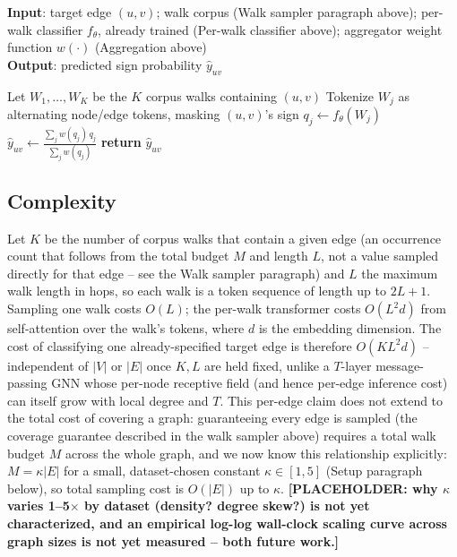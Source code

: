 \documentclass[letterpaper]{article} %
\newcommand{\method}{\textsc{Pewter}\xspace}
\newcommand{\ph}[1]{\textbf{[#1]}}  %
\theoremstyle{plain}
\theoremstyle{definition}
\begin{document}
\begin{algorithm}[tb]
\caption{\method: inference for edge $(u,v)$}
\label{alg:pewter}
\textbf{Input}: target edge $(u,v)$; walk corpus (Walk sampler paragraph above); per-walk classifier $f_\theta$, already trained (Per-walk classifier above); aggregator weight function $w(\cdot)$ (Aggregation above)\\
\textbf{Output}: predicted sign probability $\hat y_{uv}$
\begin{algorithmic}[1]
\STATE Let $W_1,\ldots,W_K$ be the $K$ corpus walks containing $(u,v)$
  \STATE Tokenize $W_j$ as alternating node/edge tokens, masking $(u,v)$'s sign
  \STATE $q_j \gets f_\theta(W_j)$ 
\ENDFOR
\STATE $\hat y_{uv} \gets \frac{\sum_j w(q_j)\, q_j}{\sum_j w(q_j)}$
\STATE \textbf{return} $\hat y_{uv}$
\end{algorithmic}
\end{algorithm}

\subsection{Complexity}
Let $K$ be the number of corpus walks that contain a given edge (an occurrence count that follows from the total budget $M$ and length $L$, not a value sampled directly for that edge -- see the Walk sampler paragraph) and $L$ the maximum walk length in hops, so each walk is a token sequence of length up to $2L+1$. Sampling one walk costs $O(L)$; the per-walk transformer costs $O(L^2 d)$ from self-attention over the walk's tokens, where $d$ is the embedding dimension. The cost of classifying one already-specified target edge is therefore $O(K L^2 d)$ -- independent of $|V|$ or $|E|$ once $K,L$ are held fixed, unlike a $T$-layer message-passing GNN whose per-node receptive field (and hence per-edge inference cost) can itself grow with local degree and $T$. This per-edge claim does not extend to the total cost of covering a graph: guaranteeing every edge is sampled (the coverage guarantee described in the walk sampler above) requires a total walk budget $M$ across the whole graph, and we now know this relationship explicitly: $M = \kappa|E|$ for a small, dataset-chosen constant $\kappa \in [1,5]$ (Setup paragraph below), so total sampling cost is $O(|E|)$ up to $\kappa$. \ph{PLACEHOLDER: why $\kappa$ varies 1--5$\times$ by dataset (density? degree skew?) is not yet characterized, and an empirical log-log wall-clock scaling curve across graph sizes is not yet measured -- both future work.}
\end{document}
